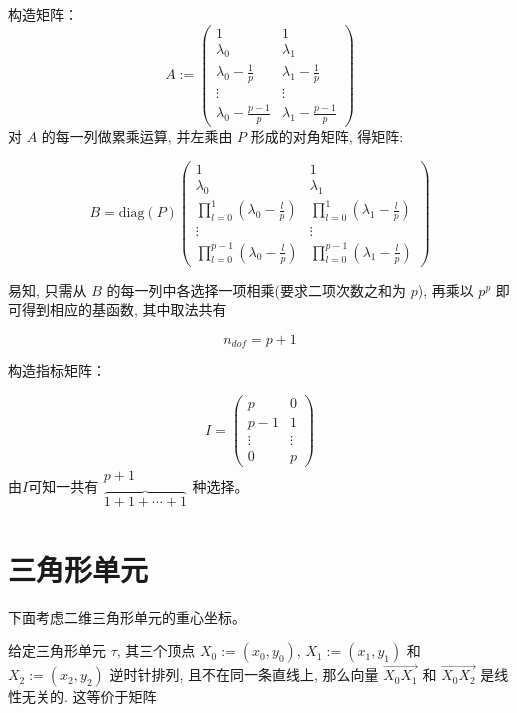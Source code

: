 \documentclass[12pt,a4paper]{article}
\begin{document}
构造矩阵：
$$
A :=                                                                            
\begin{pmatrix}  
1  &  1  \\
\lambda_0 & \lambda_1\\                                             
\lambda_0 - \frac{1}{p} & \lambda_1 - \frac{1}{p}\\   
\vdots & \vdots \\                                                     
\lambda_0 - \frac{p - 1}{p} & \lambda_1 - \frac{p - 1}{p}
\end{pmatrix}                                                                   
$$ 
对 $A$ 的每一列做累乘运算, 并左乘由 $P$ 形成的对角矩阵, 得矩阵:

$$
B = \mathrm{diag}(P)
\begin{pmatrix}
1 & 1\\
\lambda_0 & \lambda_1\\
\prod_{l=0}^{1}(\lambda_0 - \frac{l}{p}) & \prod_{l=0}^{1}(\lambda_1 - \frac{l}{p})\\
\vdots & \vdots \\
\prod_{l=0}^{p-1}(\lambda_0 - \frac{l}{p}) & \prod_{l=0}^{p-1}(\lambda_1 - \frac{l}{p}) 
\end{pmatrix}
$$

易知, 只需从 $B$ 的每一列中各选择一项相乘(要求二项次数之和为 $p$), 再乘以 $p^p$ 即可得到相应的基函数, 其中取法共有 

$$
n_{dof} = {p+1}
$$

构造指标矩阵：

$$
I = \begin{pmatrix}
p  & 0 \\ p-1 & 1 \\ \vdots & \vdots \\ 0 & p 
\end{pmatrix}
$$
由$I$可知一共有$\begin{matrix} p+1 \\ \overbrace{ 1+1+\cdots+1 }
\end{matrix}$种选择。

\section{三角形单元}
下面考虑二维三角形单元的重心坐标。

给定三角形单元 $\tau$, 其三个顶点 $X_0 :=(x_0,y_0)$, $X_1 :=(x_1,y_1)$ 和 $X_2 :=(x_2,y_2)$ 逆时针排列, 且不在同一条直线上, 那么向量 $\overrightarrow{X_0 X_1}$ 和 $\overrightarrow{X_0 X_2}$ 是线性无关的. 这等价于矩阵
\end{document}
